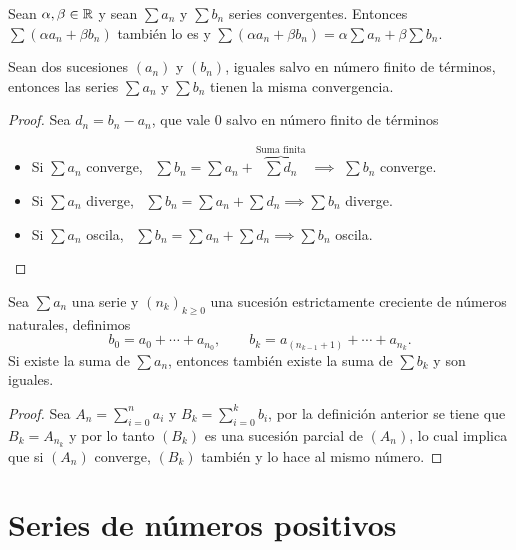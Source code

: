 \begin{prop}[Linealidad]
    Sean $\alpha, \beta \in \mathbb{R}$ y sean $\sum a_n$ y $\sum b_n$ series convergentes.
    Entonces $\sum (\alpha a_n + \beta b_n)$ también lo es y $\sum (\alpha a_n + \beta b_n)
    = \alpha \sum a_n + \beta \sum b_n$.
\end{prop}

\begin{prop}
    Sean dos sucesiones $(a_n)$ y $(b_n)$, iguales salvo en número finito de términos,
    entonces las series $\sum a_n$ y $\sum b_n$ tienen la misma convergencia.
\end{prop}

\begin{proof}
    Sea $d_n = b_n - a_n$, que vale 0 salvo en número finito de términos
    \begin{itemize}
        \item Si $\sum a_n$ converge, \, $\sum b_n = \sum a_n +
        \overbrace{\sum d_n}^\text{Suma finita}$ $\implies$ $\sum b_n$ converge.
        \item Si $\sum a_n$ diverge, \, $\sum b_n = \sum a_n + \sum d_n
        \implies \sum b_n$ diverge.
        \item Si $\sum a_n$ oscila, \, $\sum b_n = \sum a_n + \sum d_n
        \implies \sum b_n$ oscila.
    \end{itemize}
\end{proof}

\begin{prop}[Asociatividad]
    Sea $\sum a_n$ una serie y $(n_k)_{k \geq 0}$ una sucesión estrictamente creciente de
    números naturales, definimos
    \[
        b_0 = a_0 + \cdots + a_{n_0}, \qquad b_k = a_{(n_{k-1}+1)} + \cdots + a_{n_k}.
    \]
    Si existe la suma de $\sum a_n$, entonces también existe la suma de $\sum b_k$
    y son iguales.
\end{prop}

\begin{proof}
    Sea $A_n = \sum\limits_{i=0}^{n} a_i$ y $B_k = \sum\limits_{i=0}^{k} b_i$, por la
    definición anterior se tiene que $B_k = A_{n_k}$ y por lo tanto $(B_k)$ es una sucesión
    parcial de $(A_n)$, lo cual implica que si $(A_n)$ converge, $(B_k)$ también
    y lo hace al mismo número.
\end{proof}


\section{Series de números positivos}

